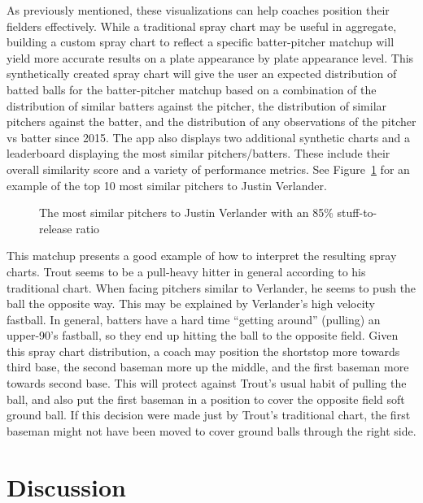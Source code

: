 \documentclass[12pt]{article}
\begin{document}
As previously mentioned, these visualizations can help coaches position their fielders effectively. While a traditional spray chart may be useful in aggregate, building a custom spray chart to reflect a specific batter-pitcher matchup will yield more accurate results on a plate appearance by plate appearance level. This synthetically created spray chart will give the user an expected distribution of batted balls for the batter-pitcher matchup based on a combination of the distribution of similar batters against the pitcher, the distribution of similar pitchers against the batter, and the distribution of any observations of the pitcher vs batter since 2015. The app also displays two additional synthetic charts and a leaderboard displaying the most similar pitchers/batters. These include their overall similarity score and a variety of performance metrics. See Figure~\ref{synthpitcher} for an example of the top 10 most similar pitchers to Justin Verlander.

\begin{figure}
\centering
{}
    \caption{The most similar pitchers to Justin Verlander with an 85\% stuff-to-release ratio}
    \label{synthpitcher}
\end{figure}

This matchup presents a good example of how to interpret the resulting spray charts. Trout seems to be a pull-heavy hitter in general according to his traditional chart. When facing pitchers similar to Verlander, he seems to push the ball the opposite way. This may be explained by Verlander's high velocity fastball. In general, batters have a hard time ``getting around'' (pulling) an upper-90's fastball, so they end up hitting the ball to the opposite field. Given this spray chart distribution, a coach may position the shortstop more towards third base, the second baseman more up the middle, and the first baseman more towards second base. This will protect against Trout's usual habit of pulling the ball, and also put the first baseman in a position to cover the opposite field soft ground ball. If this decision were made just by Trout's traditional chart, the first baseman might not have been moved to cover ground balls through the right side.





\section{Discussion}
\end{document}
